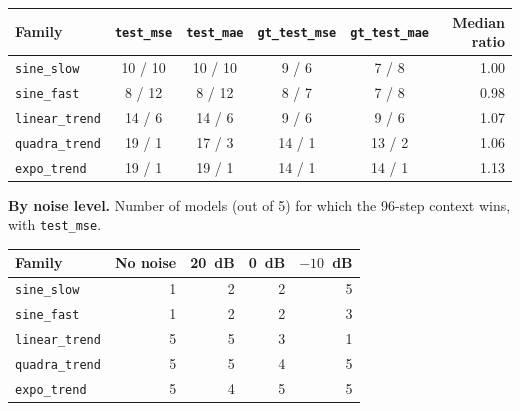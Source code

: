 \documentclass[12pt]{article}
\theoremstyle{definition}
\begin{document}
{\begin{enumerate}[label=\textbf{1.2.\arabic*}, leftmargin=*]
\begin{center}
\small
\begin{tabular}{@{}lccccr@{}}
\toprule
Family & \texttt{test\_mse} & \texttt{test\_mae} & \texttt{gt\_test\_mse} & \texttt{gt\_test\_mae} & Median ratio \\
\midrule
\texttt{sine\_slow} & 10 / 10 & 10 / 10 & 9 / 6 & 7 / 8 & 1.00 \\
\texttt{sine\_fast} & 8 / 12 & 8 / 12 & 8 / 7 & 7 / 8 & 0.98 \\
\texttt{linear\_trend} & 14 / 6 & 14 / 6 & 9 / 6 & 9 / 6 & 1.07 \\
\texttt{quadra\_trend} & 19 / 1 & 17 / 3 & 14 / 1 & 13 / 2 & 1.06 \\
\texttt{expo\_trend} & 19 / 1 & 19 / 1 & 14 / 1 & 14 / 1 & 1.13 \\
\bottomrule
\end{tabular}
\end{center}

\textbf{By noise level.} Number of models (out of 5) for which the 96-step context wins, with \texttt{test\_mse}.

\begin{center}
\small
\begin{tabular}{@{}lrrrr@{}}
\toprule
Family & No noise & 20~dB & 0~dB & $-10$~dB \\
\midrule
\texttt{sine\_slow} & 1 & 2 & 2 & 5 \\
\texttt{sine\_fast} & 1 & 2 & 2 & 3 \\
\texttt{linear\_trend} & 5 & 5 & 3 & 1 \\
\texttt{quadra\_trend} & 5 & 5 & 4 & 5 \\
\texttt{expo\_trend} & 5 & 4 & 5 & 5 \\
\bottomrule
\end{tabular}
\end{center}


\end{enumerate}}
\end{document}
